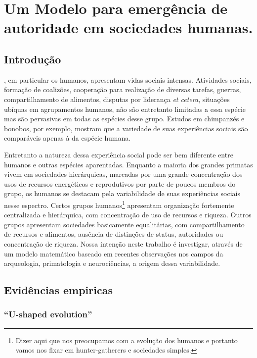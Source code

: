 \chapter{Um Modelo para emergência de autoridade em sociedades humanas.}
\label{ch:autoridade}
\section{Introdução}

, em particular os humanos, apresentam vidas sociais intensas. Atividades sociais, formação de coalizões, cooperação para realização de diversas tarefas, guerras, compartilhamento de alimentos, disputas por liderança \textit{et cetera}, situações ubíquas em agrupamentos humanos, não são entretanto limitadas a essa espécie mas são pervasivas em todas as espécies desse grupo\sourcesneeded. Estudos em chimpanzés e bonobos\cite{deWaal2007}\sourcesneeded, por exemplo, mostram que a variedade de suas experiências sociais são comparáveis apenas à da espécie humana.

Entretanto a natureza dessa experiência social pode ser bem diferente entre humanos e outras espécies aparentadas. Enquanto a maioria dos grandes primatas vivem em sociedades hierárquicas\cite{boehm2001}, marcadas por uma grande concentração dos usos de recursos energéticos e reprodutivos por parte de poucos membros do grupo, os humanos se destacam pela variabilidade de suas experiências sociais nesse espectro\cite{Vehrencamp1983}. Certos grupos humanos\footnote{Dizer aqui que nos preocupamos com a evolução dos humanos e portanto vamos nos fixar em hunter-gatherers e sociedades simples.\clarificationneeded} apresentam organização fortemente centralizada e hierárquica, com concentração de uso de recursos e riqueza. Outros grupos apresentam sociedades basicamente equalitárias, com compartilhamento de recursos e alimentos, ausência de distinções de status, autoridades ou concentração de riqueza. \sourcesneeded Nossa intenção neste trabalho é investigar, através de um modelo matemático baseado em recentes observações nos campos da arqueologia, primatologia e neurociências, a origem dessa variabilidade.

\section{Evidências empiricas}

\subsection{``U-shaped evolution''} 

